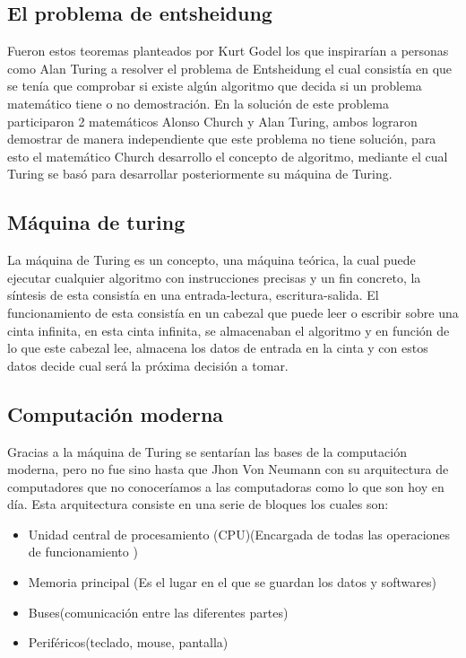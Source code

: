 \documentclass[12pt]{article}
\begin{document}
\subsection{El problema de entsheidung}
      Fueron estos teoremas planteados por Kurt Godel los que inspirarían a personas como Alan Turing a resolver el problema de Entsheidung el cual consistía en que se tenía que comprobar si existe algún algoritmo que decida si un problema matemático tiene o no  demostración. En la solución de este problema participaron 2 matemáticos  Alonso Church y Alan Turing, ambos lograron demostrar de manera independiente que este problema no tiene solución, para esto  el matemático Church desarrollo el concepto de algoritmo, mediante el cual Turing se basó para desarrollar posteriormente su máquina de Turing.
\subsection{Máquina de turing}
      La máquina de Turing es un concepto, una máquina teórica, la cual puede ejecutar cualquier algoritmo con instrucciones precisas  y un fin concreto, la síntesis de esta consistía en una entrada-lectura, escritura-salida.
      El funcionamiento de esta consistía en un cabezal que puede leer o escribir sobre una cinta infinita, en esta cinta infinita, se almacenaban el algoritmo y en función de lo que este cabezal lee, almacena los datos de entrada en la cinta y con estos datos  decide cual será la próxima decisión a tomar. 
\subsection{Computación moderna}
     Gracias a la máquina de Turing se sentarían las bases de la computación moderna, pero no fue sino hasta que Jhon Von Neumann con su arquitectura de computadores  que no conoceríamos a las computadoras como lo que son hoy en día. Esta arquitectura consiste en una serie de bloques los cuales son:\\
\begin{itemize}
    \item Unidad central de procesamiento (CPU)(Encargada  de todas las operaciones de funcionamiento )
    \item Memoria principal (Es el lugar en el que se guardan los datos y softwares)
    \item Buses(comunicación entre las diferentes partes)
    \item Periféricos(teclado, mouse, pantalla)
\end{itemize}
\end{document}
